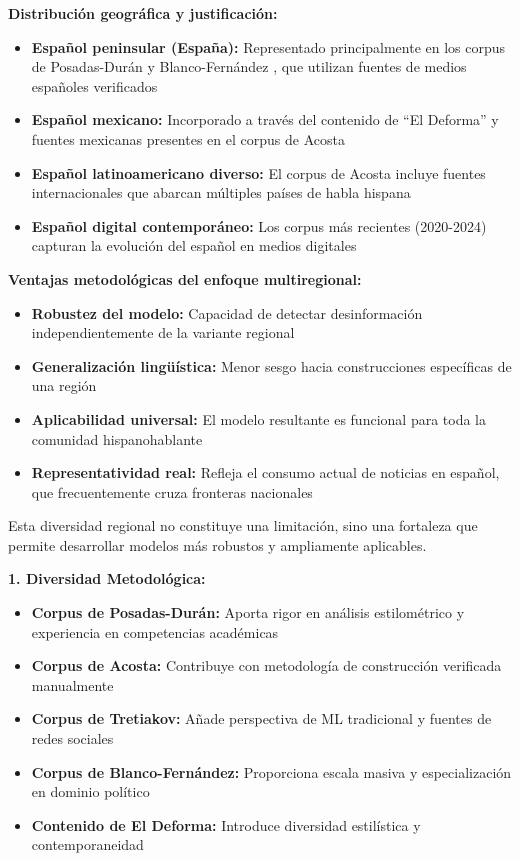 \textbf{Distribución geográfica y justificación:}
\begin{itemize}
    \item \textbf{Español peninsular (España):} Representado principalmente en los corpus de Posadas-Durán \cite{posadas2019detection} y Blanco-Fernández \cite{blanco2024enhancing}, que utilizan fuentes de medios españoles verificados
    
    \item \textbf{Español mexicano:} Incorporado a través del contenido de ``El Deforma'' y fuentes mexicanas presentes en el corpus de Acosta \cite{acosta2019construccion}
    
    \item \textbf{Español latinoamericano diverso:} El corpus de Acosta incluye fuentes internacionales que abarcan múltiples países de habla hispana
    
    \item \textbf{Español digital contemporáneo:} Los corpus más recientes (2020-2024) capturan la evolución del español en medios digitales
\end{itemize}

\textbf{Ventajas metodológicas del enfoque multiregional:}
\begin{itemize}
    \item \textbf{Robustez del modelo:} Capacidad de detectar desinformación independientemente de la variante regional
    \item \textbf{Generalización lingüística:} Menor sesgo hacia construcciones específicas de una región
    \item \textbf{Aplicabilidad universal:} El modelo resultante es funcional para toda la comunidad hispanohablante
    \item \textbf{Representatividad real:} Refleja el consumo actual de noticias en español, que frecuentemente cruza fronteras nacionales
\end{itemize}

Esta diversidad regional no constituye una limitación, sino una fortaleza que permite desarrollar modelos más robustos y ampliamente aplicables.

\textbf{1. Diversidad Metodológica:}
\begin{itemize}
    \item \textbf{Corpus de Posadas-Durán:} Aporta rigor en análisis estilométrico y experiencia en competencias académicas
    \item \textbf{Corpus de Acosta:} Contribuye con metodología de construcción verificada manualmente
    \item \textbf{Corpus de Tretiakov:} Añade perspectiva de ML tradicional y fuentes de redes sociales
    \item \textbf{Corpus de Blanco-Fernández:} Proporciona escala masiva y especialización en dominio político
    \item \textbf{Contenido de El Deforma:} Introduce diversidad estilística y contemporaneidad
\end{itemize}

